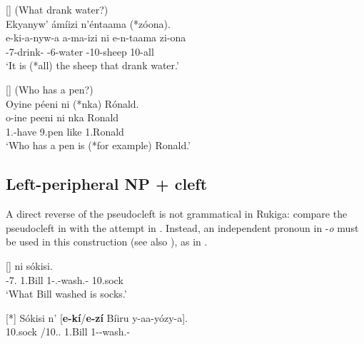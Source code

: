 \documentclass[output=paper]{langscibook}
\begin{document}
\ex
[]{
\label{bkm:Ref111494883}
(What drank water?)\\
Ekyanyw’ ámíizi n’éntaama (*zóona). \\
\gll
e-ki-a-nyw-a  a-ma-izi  ni  e-n-taama  zi-ona\\
\AUG{}-7\SM-drink-\FV{}  \AUG{}-6-water  \COP{}  \AUG{}-10-sheep  10-all\\
\glt
`It is (*all) the sheep that drank water.’\\
}

\ex
[]{
\label{bkm:Ref100085050}
(Who has a pen?)\\
Oyine péeni ni (*nka) Rónald.\\
\gll
o-ine  peeni  ni  nka  Ronald\\
1\SM{}.\REL{}-have  9.pen  \COP{}  like  1.Ronald\\
\glt
‘Who has a pen is (*for example) Ronald.’\\
}


\z


\subsection{Left-peripheral NP + cleft}
\label{bkm:Ref100080636}
\largerpage
A direct reverse of the pseudocleft is not grammatical in Rukiga: compare the pseudocleft in  with the attempt in . Instead, an independent pronoun in -\textit{o} must be used in this construction (see also ), as in .

\ea
\label{bkm:Ref98947401}
\ea
[]{
\label{bkm:Ref98947401:a}
  ni  sókisi.\\
\AUG{}-7\REL{}.\PRO{}  1.Bill  1\SM{}-\N{}.\PST{}-wash.\CAUS{}-\FV{}  \COP{}  10.sock\\
\glt
‘What Bill washed is socks.’\\
}

\ex
[*]{
\label{bkm:Ref98947401:b}  
\gll
Sókisi  n’  [\textbf{e-kí}/\textbf{e-zí}   Bíiru  y-aa-yózy-a].\\
10.sock  \COP{}  {\db}/10.\REL.\PRO{}  1.Bill  1\SM{}-\PST{}-wash.\CAUS{}-\FV{}\\
\glt
}
\end{document}
